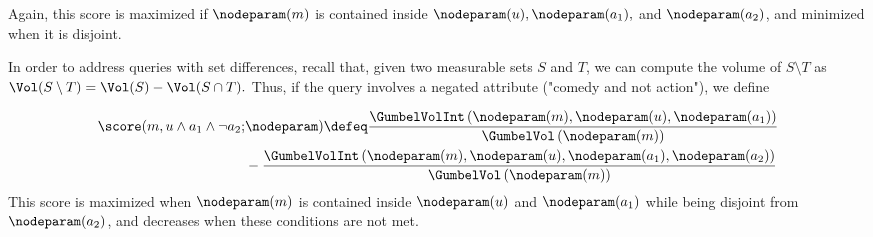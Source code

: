 Again, this score is maximized if $\nodeparam(m)$ is contained inside $\nodeparam(u), \nodeparam(a_1),$ and $\nodeparam(a_2)$, and minimized when it is disjoint.

In order to address queries with set differences, recall that, given two measurable sets $S$ and $T$, we can compute the volume of $S \setminus T$ as $\Vol(S \setminus T) = \Vol(S) - \Vol(S \cap T).$
Thus, if the query involves a negated attribute (\eg "comedy and not action"), we define

\small
\begin{align*}
\score(m,u \wedge a_1  \wedge \neg a_2; & \nodeparam)  \defeq  \frac{\GumbelVolInt\left(\nodeparam(m),\nodeparam(u), \nodeparam(a_1)\right)}
{\GumbelVol\left(\nodeparam(m)\right)} \notag \\
& - \frac{\GumbelVolInt\left(\nodeparam(m), \nodeparam(u), \nodeparam(a_1), \nodeparam(a_2)\right)}{\GumbelVol\left(\nodeparam(m)\right)}
\end{align*}
\normalsize
This score is maximized when $\nodeparam(m)$ is contained inside $\nodeparam(u)$ and $\nodeparam(a_1)$ while being disjoint from $\nodeparam(a_2)$, and decreases when these conditions are not met.
